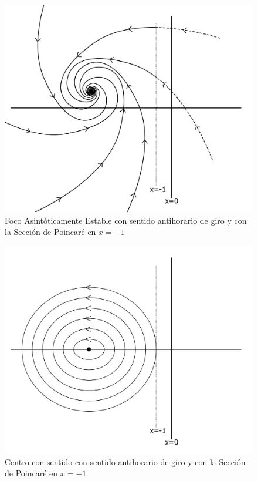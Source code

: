 \documentclass[12pt,a4paper]{report} %
\begin{document}
	\begin{figure}[h]
		\centering
		\includegraphics[width=1.1\textwidth,center]{foco3.jpg}
		\caption{Foco Asintóticamente Estable con sentido antihorario de giro y con la Sección de Poincaré en $x=-1$}
		\label{fig:foco3}
	\end{figure}\smallskip
	
	\newpage
	
	\begin{figure}[h]
		\centering
		\includegraphics[width=1.1\textwidth,center]{centro2.jpg}
		\caption{Centro con sentido con sentido antihorario de giro y con la Sección de Poincaré en $x=-1$}
		\label{fig:centro2}
	\end{figure}\smallskip
	
\end{document}
